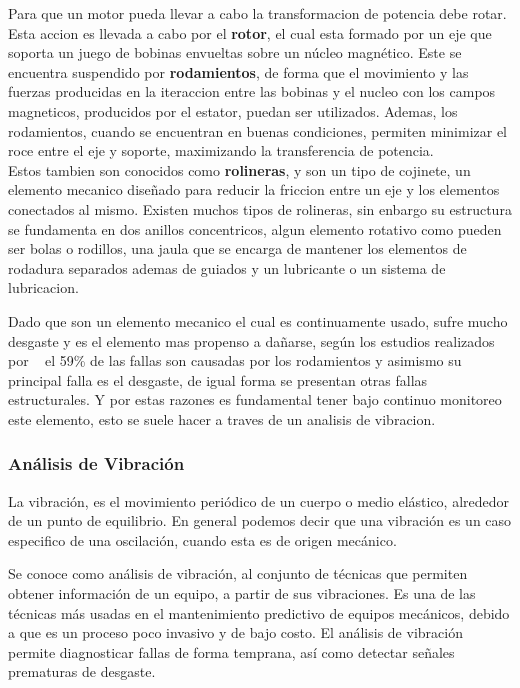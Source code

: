 Para que un motor pueda llevar a cabo la transformacion de potencia debe rotar.
Esta accion es llevada a cabo por el \textbf{rotor}, el cual esta formado por un
eje que soporta un juego de bobinas envueltas sobre un núcleo magnético. Este
se encuentra suspendido por \textbf{rodamientos}, de forma que el movimiento y
las fuerzas producidas en la iteraccion entre las bobinas y el nucleo con los
campos magneticos, producidos por el estator, puedan ser utilizados. Ademas,
los rodamientos, cuando se encuentran en buenas condiciones, permiten minimizar
el roce entre el eje y soporte, maximizando la transferencia de potencia.\\


Estos tambien son conocidos como \textbf{rolineras}, y son un tipo de cojinete,
un elemento mecanico diseñado para reducir la friccion entre un eje y los
elementos conectados al mismo. Existen muchos tipos de rolineras, sin enbargo
su estructura se fundamenta en dos anillos concentricos, algun elemento rotativo
como pueden ser bolas o rodillos, una jaula que se encarga de mantener los
elementos de rodadura separados ademas de guiados y un lubricante o un sistema
de lubricacion.


Dado que son un elemento mecanico el cual es continuamente usado, sufre mucho
desgaste y es el elemento mas propenso a dañarse, según los estudios realizados
por ~\textcite{Kammermann} el 59\% de las fallas son causadas por los rodamientos
y asimismo su principal falla es el desgaste, de igual forma se presentan
otras fallas estructurales. Y por estas razones es fundamental tener bajo continuo
monitoreo este elemento, esto se suele hacer a traves de un analisis de vibracion.




\subsubsection{Análisis de Vibración}

La vibración, es el  movimiento periódico de un cuerpo o medio
elástico, alrededor de un punto de equilibrio. En general podemos decir que una
vibración es un caso especifico de una oscilación, cuando esta es de origen
mecánico.


Se conoce como análisis de vibración, al conjunto de técnicas que permiten
obtener información de un equipo, a partir de sus vibraciones. Es una de las
técnicas más usadas en el mantenimiento predictivo de equipos mecánicos, debido
a que es un proceso poco invasivo y de bajo costo. El análisis de vibración
permite diagnosticar fallas de forma temprana, así como detectar señales
prematuras de desgaste.


